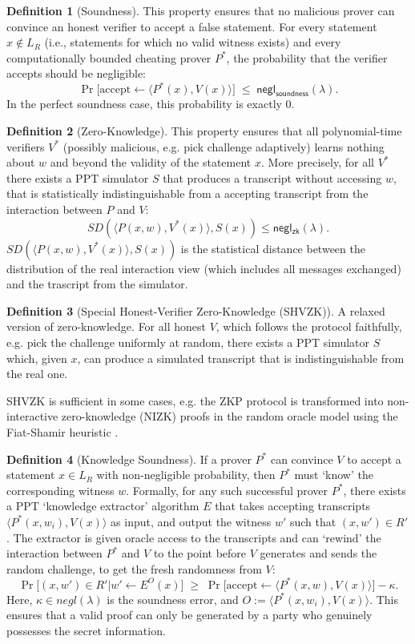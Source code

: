 \documentclass[12pt]{article}
\theoremstyle{definition}
\newtheorem{definition}{Definition}[section]
\begin{document}
\begin{definition}[Soundness] This property ensures that no malicious prover can convince an honest verifier to accept a false statement. For every statement \(x\notin L_R\) (i.e., statements for which no valid witness exists) and every computationally bounded cheating prover \(P^*\), the probability that the verifier accepts should be negligible:
  \[
    \Pr\bigl[\text{accept} \leftarrow \langle P^*(x), V(x)\rangle\bigr]
    \;\le\; \mathsf{negl_{soundness}}(\lambda).
  \]
 In the perfect soundness case, this probability is exactly 0.
\end{definition}
\begin{definition}[Zero-Knowledge] This property ensures that all polynomial-time verifiers $V^*$ (possibly malicious, e.g. pick challenge adaptively) learns nothing about $w$ and beyond the validity of the statement $x$. More precisely, for all $V^*$ there exists a PPT simulator $S$ that produces a transcript without accessing $w$, that is statistically indistinguishable from a accepting transcript from the interaction between $P$ and $V$:
  \[
  SD(\langle P(x,w),V^*(x)\rangle , S(x))\leq \mathsf{negl_{zk}}(\lambda).
  \]
  $SD(\langle P(x,w),V^*(x)\rangle , S(x))$ is the statistical distance between the distribution of the real interaction view (which includes all messages exchanged) and the trascript from the simulator.
\end{definition}

\begin{definition}[Special Honest-Verifier Zero-Knowledge (SHVZK)]
A relaxed version of zero-knowledge. For all honest $V$, which follows the protocol faithfully, e.g. pick the challenge uniformly at random, there exists a PPT simulator $S$ which, given $x$, can produce a simulated transcript that is indistinguishable from the real one.

SHVZK is sufficient in some cases, e.g. the ZKP protocol is transformed into non-interactive zero-knowledge (NIZK) proofs in the random oracle model \cite{RO} using the Fiat-Shamir heuristic \cite{FS}.
\end{definition}

\begin{definition}[Knowledge Soundness] If a prover \(P^*\) can convince $V$ to accept a statement \(x \in L_R\) with non-negligible probability, then \(P^*\) must `know' the corresponding witness \(w\). Formally, for any such successful prover \(P^*\), there exists a PPT `knowledge extractor' algorithm \(E\) that takes accepting transcripts $\langle P^*(x,w_i),V(x)\rangle$ as input, and output the witness \(w'\) such that \((x,w') \in R'\). The extractor is given oracle access to the transcripts and can `rewind' the interaction between $P^*$ and $V$ to the point before $V$ generates and sends the random challenge, to get the fresh randomness from $V$:
  \[
  \Pr\bigl[(x,w') \in R'| w' \leftarrow E^O(x)\bigr]
  \;\ge\; \Pr\bigl[\text{accept} \leftarrow \langle P^*(x,w), V(x)\rangle\bigr] - \kappa.
  \]
  Here, \(\kappa \in negl(\lambda)\) is the soundness error, and $O:=\langle P^*(x,w_i),V(x)\rangle$. This ensures that a valid proof can only be generated by a party who genuinely possesses the secret information.
\end{definition}
\end{document}
